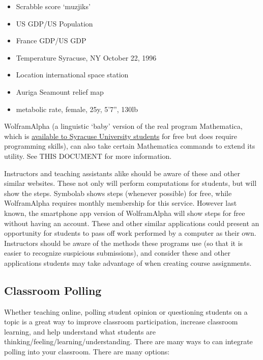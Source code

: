 	\begin{itemize}
	\item Scrabble score `muzjiks' 
	\item US GDP/US Population
	\item France GDP/US GDP
	\item Temperature Syracuse, NY October 22, 1996
	\item Location international space station
	\item Auriga Seamount relief map
	\item metabolic rate, female, 25y, 5'7'', 130lb
	\end{itemize} 

WolframAlpha (a linguistic `baby' version of the real program Mathematica, which is \href{https://answers.syr.edu/display/ecs/Software}{available to Syracuse University students} for free but does require programming skills), can also take certain Mathematica commands to extend its utility. See THIS DOCUMENT for more information. 

Instructors and teaching assistants alike should be aware of these and other similar websites. These not only will perform computations for students, but will show the steps. Symbolab shows steps (whenever possible) for free, while WolframAlpha requires monthly membership for this service. However last known, the smartphone app version of WolframAlpha will show steps for free without having an account. These and other similar applications could present an opportunity for students to pass off work performed by a computer as their own. Instructors should be aware of the methods these programs use (so that it is easier to recognize suspicious submissions), and consider these and other applications students may take advantage of when creating course assignments. 



\subsection{Classroom Polling}

Whether teaching online, polling student opinion or questioning students on a topic is a great way to improve classroom participation, increase classroom learning, and help understand what students are thinking/feeling/learning/understanding. There are many ways to can integrate polling into your classroom. There are many options:
	

